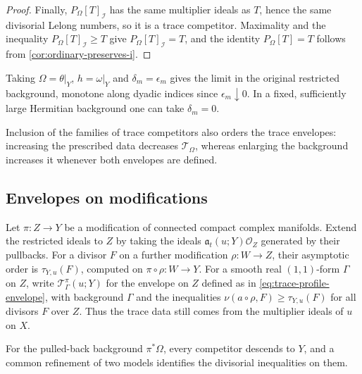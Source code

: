 \begin{proof}
Finally, $P_\Omega[T]_{\mathcal I}$ has the same multiplier ideals as $T$, hence the same divisorial Lelong numbers, so it is a trace competitor. Maximality and the inequality $P_\Omega[T]_{\mathcal I}\geq T$ give $P_\Omega[T]_{\mathcal I}=T$, and the identity $P_\Omega[T]=T$ follows from \cref{cor:ordinary-preserves-i}.
\end{proof}

Taking $\Omega=\theta|_Y$, $h=\omega|_Y$ and $\delta_m=\epsilon_m$ gives the limit in the original restricted background, monotone along dyadic indices since $\epsilon_m\downarrow0$. In a fixed, sufficiently large Hermitian background one can take $\delta_m=0$.

Inclusion of the families of trace competitors also orders the trace envelopes: increasing the prescribed data decreases $\mathcal T_\Omega$, whereas enlarging the background increases it whenever both envelopes are defined.

\subsection{Envelopes on modifications}

Let $\pi\colon Z\to Y$ be a modification of connected compact complex manifolds. Extend the restricted ideals to $Z$ by taking the ideals $\mathfrak a_t(u;Y)\mathcal O_Z$ generated by their pullbacks. For a divisor $F$ on a further modification $\rho\colon W\to Z$, their asymptotic order is $\tau_{Y,u}(F)$, computed on $\pi\circ\rho\colon W\to Y$. For a smooth real $(1,1)$-form $\Gamma$ on $Z$, write $\mathcal T^\pi_\Gamma(u;Y)$ for the envelope on $Z$ defined as in \eqref{eq:trace-profile-envelope}, with background $\Gamma$ and the inequalities $\nu(a\circ\rho,F)\geq\tau_{Y,u}(F)$ for all divisors $F$ over $Z$. Thus the trace data still comes from the multiplier ideals of $u$ on $X$.

For the pulled-back background $\pi^*\Omega$, every competitor descends to $Y$, and a common refinement of two models identifies the divisorial inequalities on them.

